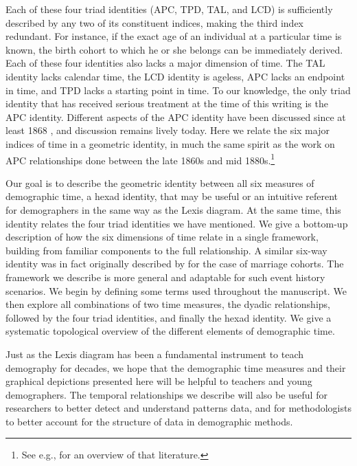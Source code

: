 \documentclass[12pt,oneside,a4paper]{article} %
\begin{document}
Each of these four triad identities (APC, TPD, TAL, and LCD) is sufficiently
described by any two of its constituent indices, making the third index
redundant. For instance, if the exact age of an individual at a particular
time is known, the birth cohort to which he or she belongs can be immediately derived. Each of these four identities also lacks a major dimension of time. The TAL identity lacks calendar time, the LCD identity is ageless, APC lacks an endpoint in time, and TPD lacks a starting point in time.
To our knowledge, the only triad identity that has received serious
treatment at the time of this writing is the APC identity. Different
aspects of the APC identity have been discussed since at least 1868
\citep{knapp1868ermittlung}, and discussion remains lively today. Here we relate the six major indices of time in a geometric identity, in much the same spirit as the work on APC relationships done between the late
1860s and mid 1880s.\footnote{See e.g., \citet{keiding2011age} for an overview of that literature.} 

Our goal is to describe the geometric identity between all
six measures of demographic time, a hexad identity, that may be useful or an intuitive
referent for demographers in the same way as the Lexis diagram. At the same time, this identity relates the
four triad identities we have mentioned. We give a bottom-up
description of how the six dimensions of time relate in a single framework,
building from familiar components to the full relationship. A similar
six-way identity was in fact originally described by \citet{lexis1875einleitung}
for the case of marriage cohorts. The framework we describe is more general and
adaptable for such event history scenarios.
We begin by defining some terms used throughout the manuscript.
We then explore all combinations of two time measures, the dyadic relationships, followed by the four triad identities, and
finally the hexad identity. We give a systematic topological overview of the
different elements of demographic time. 

Just as the Lexis diagram has been a fundamental instrument to
teach demography for decades, we hope that the demographic time measures and
their graphical depictions presented here will be helpful to teachers and
young demographers. The temporal relationships we describe will also be useful
for researchers to better detect and understand patterns data, and for
methodologists to better account for the structure of data in demographic methods.
\end{document}
